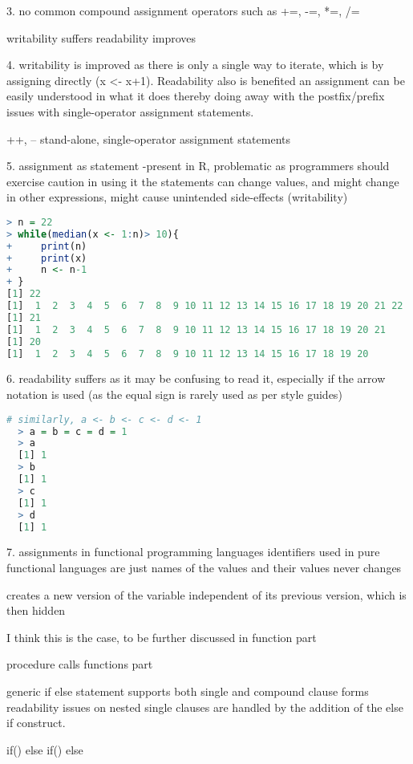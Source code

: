 \documentclass[12pt]{article}
\begin{document}
3.
no common compound assignment operators such as +=, -=, *=, /=

writability suffers
readability improves

4.
writability is improved as there is only a single way to iterate, which is by assigning directly (x <- x+1). Readability also is benefited an assignment can be easily understood in what it does thereby doing away with the postfix/prefix issues with single-operator assignment statements.

++, -- stand-alone, single-operator assignment statements

5. assignment as statement
-present in R, problematic as programmers should exercise caution in using it the statements can change values, and might change in other expressions, might cause unintended side-effects (writability)

\begin{lstlisting}[language=R]
> n = 22
> while(median(x <- 1:n)> 10){
+     print(n)
+     print(x)
+     n <- n-1
+ }
[1] 22
[1]  1  2  3  4  5  6  7  8  9 10 11 12 13 14 15 16 17 18 19 20 21 22
[1] 21
[1]  1  2  3  4  5  6  7  8  9 10 11 12 13 14 15 16 17 18 19 20 21
[1] 20
[1]  1  2  3  4  5  6  7  8  9 10 11 12 13 14 15 16 17 18 19 20
\end{lstlisting}

6.
readability suffers as it may be confusing to read it, especially if the arrow notation is used (as the equal sign is rarely used as per style guides)

\begin{lstlisting}[language=R]
  # similarly, a <- b <- c <- d <- 1
  > a = b = c = d = 1
  > a
  [1] 1
  > b
  [1] 1
  > c
  [1] 1
  > d
  [1] 1
\end{lstlisting}

7. assignments in functional programming languages
identifiers used in pure functional languages are just names of the values and their values never changes

creates a new version of the variable independent of its previous version, which is then hidden

I think this is the case, to be further discussed in function part

procedure calls
 functions part


generic if else statement
supports both single and compound clause forms
readability issues on nested single clauses are handled by the addition of the else if construct.

if(){}
else if(){}
else{}
\end{document}
